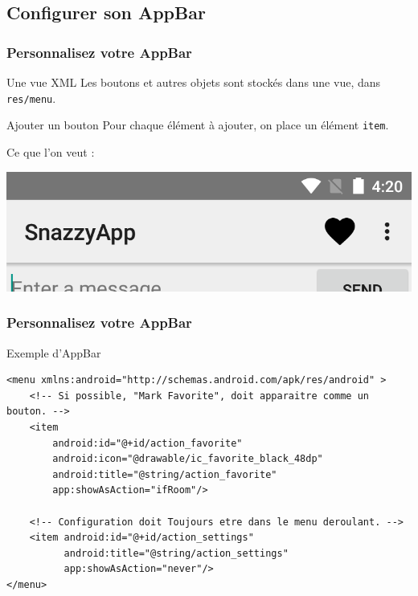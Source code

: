 \documentclass{beamer}
\begin{document}
\subsection{Configurer son AppBar}

\begin{frame}
\frametitle{Personnalisez votre AppBar}
\begin{block}{Une vue XML}
  Les boutons et autres objets sont stockés dans une vue, dans \verb!res/menu!.
\end{block}
\pause
\begin{block}{Ajouter un bouton}
  Pour chaque élément à ajouter, on place un élément \verb!item!.
\end{block}
\pause
\begin{block}{Ce que l'on veut :}
  \begin{center}
  \includegraphics[scale=0.2]{appbar_modif.png}
  \end{center}
\end{block}
\end{frame}

\begin{frame}[fragile]
\frametitle{Personnalisez votre AppBar}
\begin{exampleblock}{Exemple d'AppBar}
\lstset{language=xml}
\begin{lstlisting}
<menu xmlns:android="http://schemas.android.com/apk/res/android" >
    <!-- Si possible, "Mark Favorite", doit apparaitre comme un bouton. -->
    <item
        android:id="@+id/action_favorite"
        android:icon="@drawable/ic_favorite_black_48dp"
        android:title="@string/action_favorite"
        app:showAsAction="ifRoom"/>

    <!-- Configuration doit Toujours etre dans le menu deroulant. -->
    <item android:id="@+id/action_settings"
          android:title="@string/action_settings"
          app:showAsAction="never"/>
</menu>
\end{lstlisting}
\lstset{language=java}
\end{exampleblock}

\end{frame}
\end{document}
